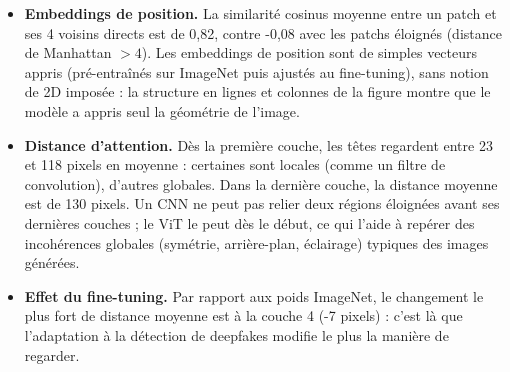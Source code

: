 \begin{itemize}
\item \textbf{Embeddings de position.} La similarité cosinus moyenne entre un patch et ses 4 voisins directs est de 0{,}82, contre -0{,}08 avec les patchs éloignés (distance de Manhattan $>4$). Les embeddings de position sont de simples vecteurs appris (pré-entraînés sur ImageNet puis ajustés au fine-tuning), sans notion de 2D imposée : la structure en lignes et colonnes de la figure montre que le modèle a appris seul la géométrie de l'image.
\item \textbf{Distance d'attention.} Dès la première couche, les têtes regardent entre 23 et 118 pixels en moyenne : certaines sont locales (comme un filtre de convolution), d'autres globales. Dans la dernière couche, la distance moyenne est de 130 pixels. Un CNN ne peut pas relier deux régions éloignées avant ses dernières couches ; le ViT le peut dès le début, ce qui l'aide à repérer des incohérences globales (symétrie, arrière-plan, éclairage) typiques des images générées.
\item \textbf{Effet du fine-tuning.} Par rapport aux poids ImageNet, le changement le plus fort de distance moyenne est à la couche 4 (-7 pixels) : c'est là que l'adaptation à la détection de deepfakes modifie le plus la manière de regarder.
\end{itemize}
